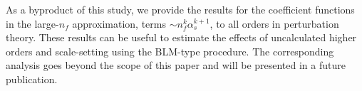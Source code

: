 As a byproduct of this study, we provide the results for the coefficient functions 
in the large-$n_f$ approximation, terms $\sim n_f^k\alpha_s^{k+1}$,  to all orders in perturbation theory.
These results can be useful to estimate the effects of uncalculated higher orders and scale-setting 
using the BLM-type procedure. The corresponding analysis goes beyond the scope of this paper and will be presented in a future publication.
 
